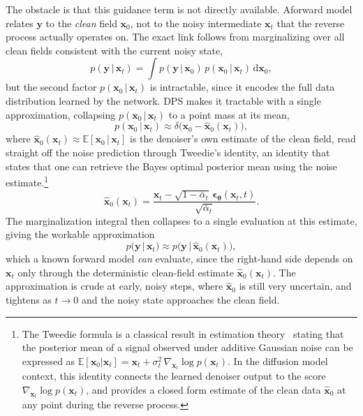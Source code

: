The obstacle is that this guidance term is not directly available. Aforward model relates $\bm{y}$ to the \emph{clean} field $\bm{x}_0$, not to the noisy intermediate $\bm{x}_t$ that the reverse process actually operates on. The exact link follows from marginalizing over all clean fields consistent with the current noisy state,
\begin{equation}
    p(\bm{y}\,|\,\bm{x}_t) = \int p(\bm{y}\,|\,\bm{x}_0)\,p(\bm{x}_0\,|\,\bm{x}_t)\,\mathrm{d}\bm{x}_0,
    \label{eq:dps_marginalisation}
\end{equation}
but the second factor $p(\bm{x}_0\,|\,\bm{x}_t)$ is intractable, since it encodes the full data distribution learned by the network. DPS makes it tractable with a single approximation, collapsing $p(\bm{x}_0\,|\,\bm{x}_t)$ to a point mass at its mean,
\begin{equation}
    p(\bm{x}_0\,|\,\bm{x}_t) \approx \delta\!\big(\bm{x}_0 - \hat{\bm{x}}_0(\bm{x}_t)\big),
    \label{eq:dps_delta_approx}
\end{equation}
where $\hat{\bm{x}}_0(\bm{x}_t)\approx\mathbb{E}[\bm{x}_0\,|\,\bm{x}_t]$ is the denoiser's own estimate of the clean field, read straight off the noise prediction through Tweedie's identity, an identity that states that one can retrieve the Bayes optimal posterior mean using the noise estimate.\footnote{The Tweedie formula is a classical result in estimation theory~\citep{Efron01122011} 
stating that the posterior mean of a signal observed under additive Gaussian noise 
can be expressed as $\mathbb{E}[\bm{x}_0|\bm{x}_t] = \bm{x}_t + \sigma_t^2\,\nabla_{\bm{x}_t}\!\log p(\bm{x}_t)$. 
In the diffusion model context, this identity connects the learned denoiser output 
to the score $\nabla_{\bm{x}_t}\!\log p(\bm{x}_t)$, and provides a closed form 
estimate of the clean data $\hat{\bm{x}}_0$ at any point during the reverse process.}
\begin{equation}
    \hat{\bm{x}}_0(\bm{x}_t) = \frac{\bm{x}_t - \sqrt{1-\bar\alpha_t}\,\bm{\epsilon}_{\bm{\theta}}(\bm{x}_t,t)}{\sqrt{\bar\alpha_t}}.
    \label{eq:dps_xhat}
\end{equation}
The marginalization integral then collapses to a single evaluation at this estimate, giving the workable approximation
\begin{equation}
    p(\bm{y}\,|\,\bm{x}_t) \approx p\!\big(\bm{y}\,|\,\hat{\bm{x}}_0(\bm{x}_t)\big),
    \label{eq:dps_likelihood_approx}
\end{equation}
which a known forward model \emph{can} evaluate, since the right-hand side depends on $\bm{x}_t$ only through the deterministic clean-field estimate $\hat{\bm{x}}_0(\bm{x}_t)$. The approximation is crude at early, noisy steps, where $\hat{\bm{x}}_0$ is still very uncertain, and tightens as $t\to0$ and the noisy state approaches the clean field.

